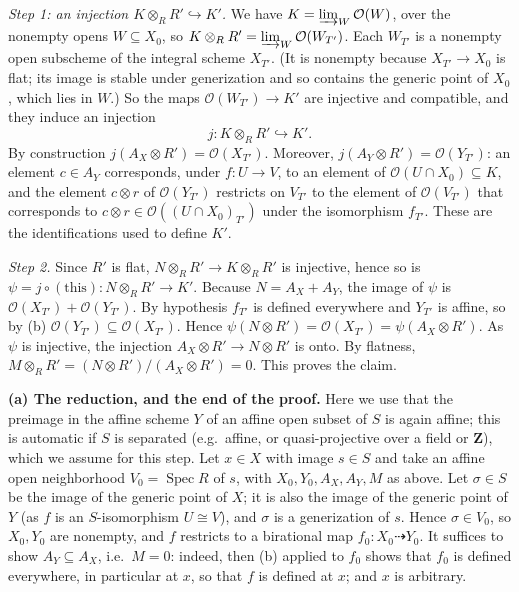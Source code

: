 \documentclass[11pt]{article}
\begin{document}
\emph{Step 1: an injection $K\otimes_RR'\hookrightarrow K'$.} We have $K=\varinjlim_W\mathcal O(W)$, over the nonempty opens $W\subseteq X_0$, so $K\otimes_RR'=\varinjlim_W\mathcal O(W_{T'})$. Each $W_{T'}$ is a nonempty open subscheme of the integral scheme $X_{T'}$. (It is nonempty because $X_{T'}\to X_0$ is flat; its image is stable under generization and so contains the generic point of $X_0$, which lies in $W$.) So the maps $\mathcal O(W_{T'})\to K'$ are injective and compatible, and they induce an injection
\[ j:K\otimes_RR'\hookrightarrow K'. \]
By construction $j(A_X\otimes R')=\mathcal O(X_{T'})$. Moreover, $j(A_Y\otimes R')=\mathcal O(Y_{T'})$: an element $c\in A_Y$ corresponds, under $f:U\to V$, to an element of $\mathcal O(U\cap X_0)\subseteq K$, and the element $c\otimes r$ of $\mathcal O(Y_{T'})$ restricts on $V_{T'}$ to the element of $\mathcal O(V_{T'})$ that corresponds to $c\otimes r\in\mathcal O((U\cap X_0)_{T'})$ under the isomorphism $f_{T'}$. These are the identifications used to define $K'$.

\emph{Step 2.} Since $R'$ is flat, $N\otimes_RR'\to K\otimes_RR'$ is injective, hence so is $\psi=j\circ(\text{this}):N\otimes_RR'\to K'$. Because $N=A_X+A_Y$, the image of $\psi$ is $\mathcal O(X_{T'})+\mathcal O(Y_{T'})$. By hypothesis $f_{T'}$ is defined everywhere and $Y_{T'}$ is affine, so by (b) $\mathcal O(Y_{T'})\subseteq\mathcal O(X_{T'})$. Hence $\psi(N\otimes R')=\mathcal O(X_{T'})=\psi(A_X\otimes R')$. As $\psi$ is injective, the injection $A_X\otimes R'\to N\otimes R'$ is onto. By flatness, $M\otimes_RR'=(N\otimes R')/(A_X\otimes R')=0$. This proves the claim.

\textbf{(a) The reduction, and the end of the proof.} Here we use that the preimage in the affine scheme $Y$ of an affine open subset of $S$ is again affine; this is automatic if $S$ is separated (e.g.\ affine, or quasi-projective over a field or $\mathbf Z$), which we assume for this step. Let $x\in X$ with image $s\in S$ and take an affine open neighborhood $V_0=\operatorname{Spec}R$ of $s$, with $X_0,Y_0,A_X,A_Y,M$ as above. Let $\sigma\in S$ be the image of the generic point of $X$; it is also the image of the generic point of $Y$ (as $f$ is an $S$-isomorphism $U\cong V$), and $\sigma$ is a generization of $s$. Hence $\sigma\in V_0$, so $X_0,Y_0$ are nonempty, and $f$ restricts to a birational map $f_0:X_0\dashrightarrow Y_0$. It suffices to show $A_Y\subseteq A_X$, i.e.\ $M=0$: indeed, then (b) applied to $f_0$ shows that $f_0$ is defined everywhere, in particular at $x$, so that $f$ is defined at $x$; and $x$ is arbitrary.
\end{document}
